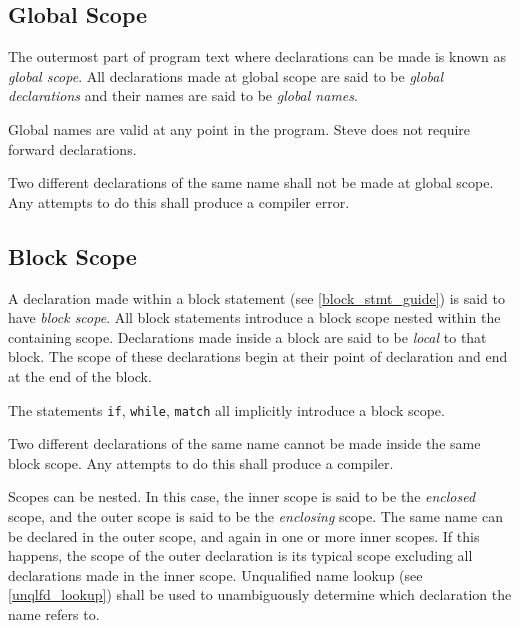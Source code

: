 \subsection{Global Scope} \label{global_scope}

The outermost part of program text where declarations can be made is known as \textit{global scope}. All declarations made at global scope are said to be \textit{global declarations} and their names are said to be \textit{global names}.

Global names are valid at any point in the program. Steve does not require forward declarations. 

Two different declarations of the same name shall not be made at global scope. Any attempts to do this shall produce a compiler error.

\subsection{Block Scope} \label{block_scope}

A declaration made within a block statement (see \ref{block_stmt_guide}) is said to have \textit{block scope}. All block statements introduce a block scope nested within the containing scope. Declarations made inside a block are said to be \textit{local} to that block. The scope of these declarations begin at their point of declaration and end at the end of the block.

The statements \texttt{if}, \texttt{while}, \texttt{match} all implicitly introduce a block scope.

Two different declarations of the same name cannot be made inside the same block scope. Any attempts to do this shall produce a compiler. 

Scopes can be nested. In this case, the inner scope is said to be the \textit{enclosed} scope, and the outer scope is said to be the \textit{enclosing} scope. The same name can be declared in the outer scope, and again in one or more inner scopes. If this happens, the scope of the outer declaration is its typical scope excluding all declarations made in the inner scope. Unqualified name lookup (see \ref{unqlfd_lookup}) shall be used to unambiguously determine which declaration the name refers to. 


